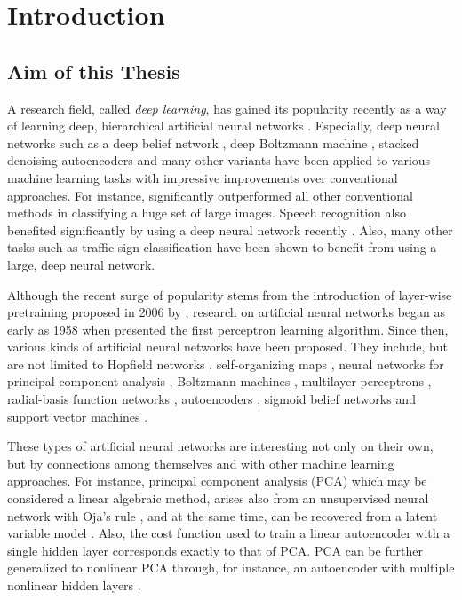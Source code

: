 \documentclass{now}
\begin{document}
\chapter{Introduction}


\section{Aim of this Thesis}

A research field, called \textit{deep learning}, has gained
its popularity recently as a way of learning deep,
hierarchical artificial neural networks \citep[see, for
example,][]{Bengio2009a}.  Especially, deep neural networks
such as a deep belief network \citep{Hinton2006nc}, deep
Boltzmann machine \citep{Salakhutdinov2009a}, stacked
denoising autoencoders \citep{Vincent2010} and many other
variants have been applied to various machine learning tasks
with impressive improvements over conventional approaches.
For instance, \citet{Krizhevsky2012} significantly
outperformed all other conventional methods in classifying a
huge set of large images. Speech recognition also benefited
significantly by using a deep neural network recently
\citep{Hinton2012sp}. Also, many other tasks such as traffic
sign classification \citep{Ciresan2012c} have been shown to
benefit from using a large, deep neural network.

Although the recent surge of popularity stems from the
introduction of layer-wise pretraining proposed in 2006 by
\citet{Hinton2006,Bengio2007nips,Ranzato2007}, research on
artificial neural networks began as early as 1958 when
\citet{Rosenblatt1958} presented the first perceptron
learning algorithm. Since then, various kinds of artificial
neural networks have been proposed. They include, but are
not limited to Hopfield networks \citep{Hopfield1982},
self-organizing maps \citep{Kohonen1982}, neural networks
for principal component analysis \citep{Oja1982}, Boltzmann
machines \citep{Ackley1985}, multilayer perceptrons
\citep{Rumelhart1986}, radial-basis function networks
\citep{Broomhead1988}, autoencoders \citep{Baldi1989},
sigmoid belief networks \citep{Neal1992} and support vector
machines \citep{Cortes1995}.

These types of artificial neural networks are interesting
not only on their own, but by connections among themselves
and with other machine learning approaches. For instance,
principal component analysis
(PCA) which
may be considered a linear algebraic method, arises also
from an unsupervised neural network with Oja's rule
\citep{Oja1982}, and at the same time, can be recovered from
a latent variable model \citep{Tipping1999,Roweis1998}.
Also, the cost function used to train a linear autoencoder
with a single hidden layer corresponds exactly to that of
PCA.  PCA can be further generalized to nonlinear PCA
through, for instance, an autoencoder with multiple
nonlinear hidden layers \citep{Kramer1991,Oja1991}. 
\end{document}
